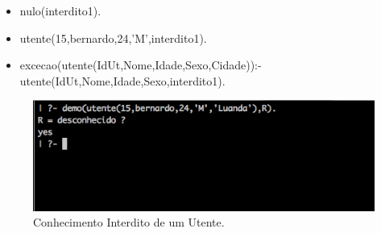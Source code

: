 \documentclass[25pt]{article}
\begin{document}
\begin{itemize}
\item nulo(interdito1).
\item utente(15,bernardo,24,'M',interdito1).
\item excecao(utente(IdUt,Nome,Idade,Sexo,Cidade)):- utente(IdUt,Nome,Idade,Sexo,interdito1).
\end{itemize}

\begin{figure}[H]
\centering\includegraphics[scale=0.55]{interdito}
\caption{\label{fig:controller}Conhecimento Interdito de um Utente.}
\end{figure}
 
\end{document}
